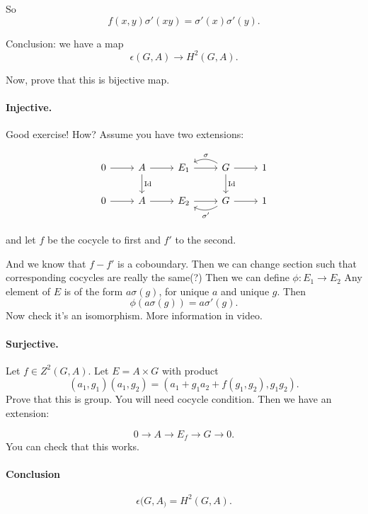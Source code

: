So
 \[
     f(x,y) \sigma'(xy) = \sigma'(x) \sigma'(y)
.\] 

Conclusion: we have a map
\[
    \epsilon(G, A) \to  H^2(G, A)
.\] 

Now, prove that this is bijective map.
\paragraph{Injective.}
Good exercise!
How?
Assume you have two extensions:

\[
    \begin{tikzcd}
        0 \arrow[r, ""] 
        & A \arrow[r, ""] \arrow[d, "\operatorname{Id}"]
        & E_1 \arrow[r, ""] 
        & G \arrow[r, ""] \arrow[d, "\operatorname{Id}"] \arrow[l, "\sigma", bend right, swap]
        & 1 \\
        0 \arrow[r, ""] 
        & A \arrow[r, ""]
        & E_2 \arrow[r, ""]
        & G \arrow[r, ""] \arrow[l, "\sigma'", bend left]
        & 1 \\
    \end{tikzcd}
\]
and let $f$ be the cocycle to first and $f'$ to the second.

And we know that  $f - f'$ is a coboundary.
Then we can change section such that corresponding cocycles are really the same(?)
Then we can define  $\phi: E_1 \to  E_2$
Any element of $E$ is of the form  $a\sigma(g)$, for unique  $a$ and unique  $g$.
Then 
 \[
     \phi(a\sigma(g)) = a \sigma'(g)
.\] 
Now check it's an isomorphism.
More information in video.

\paragraph{Surjective.}

Let $f \in Z^2(G,A)$.
Let $E = A \times G$ with product
\[
    (a_1,g_1)(a_1,g_2) = (a_1+g_1a_2+\boxed{f(g_1,g_2)}, g_1g_2)
.\] 
Prove that this is group. You will need cocycle condition.
Then we have an extension:

\[
 0\to A \to  E_f \to  G \to  0
.\] 
You can check that this works.

\paragraph{Conclusion}
\[
    \epsilon(G,A_) = H^2(G,A)
.\] 

